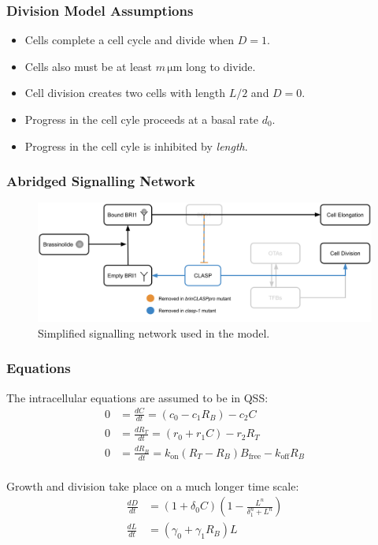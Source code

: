 \documentclass{beamer}
\newcommand{\um}{\unit{\micro\metre}}
\begin{document}
\begin{frame}
\frametitle{Division Model Assumptions}
\begin{itemize}
    \setlength\itemsep{0.8em}
    \item Cells complete a cell cycle and divide when $D=1$.
    \item Cells also must be at least $m\,\um$ long to divide.
    \item Cell division creates two cells with length $L / 2$ and $D = 0$.
    \item Progress in the cell cyle proceeds at a basal rate $d_{0}$.
    \item Progress in the cell cyle is inhibited by \emph{length}. 
\end{itemize}
\medskip
\end{frame}

\begin{frame}
\frametitle{Abridged Signalling Network}
\begin{figure}
  \centering
  \includegraphics[width=\textwidth]{network-simplified.png}
  \caption{Simplified signalling network used in the model.}
\end{figure}
\end{frame}


\begin{frame}
\frametitle{Equations}

The intracellular equations are assumed to be in QSS:
$$
\begin{aligned}
  0 &= \frac{ dC }{ dt } = (c_{0} - c_{1}R_{B}) - c_{2}C \\[5pt]
  0 &= \frac{ dR_{T} }{ dt } = (r_{0}  + r_{1}C) - r_{2}R_{T} \\[5pt]
  0 &= \frac{ dR_{B} }{ dt } = k_{\text{on}}(R_{T} - R_{B})B_{\text{free}} - k_{\text{off}}R_{B} \\[5pt]
\end{aligned} 
$$

Growth and division take place on a much longer time scale:
$$
\begin{aligned}
\frac{ dD }{ dt } &= (1 + \delta_{0}C) \left( 1 - \frac{ L^{ n } }{ \delta_{1}^{ n } + L^{ n } } \right)  \\[5pt]
\frac{ dL }{ dt } &= \left(\gamma_{0}  +  \gamma_{1}R_{B}\right)L  
\end{aligned}
$$
\end{frame}
\end{document}
